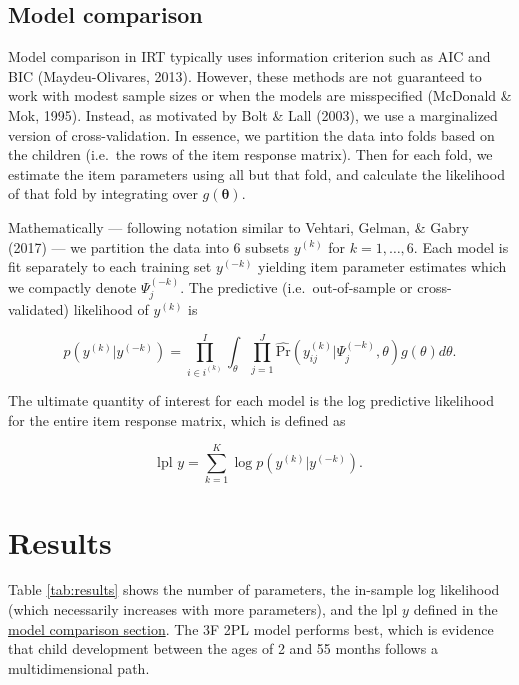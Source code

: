 \documentclass[10pt, letterpaper]{article}
\begin{document}
\hypertarget{modelcompare}{%
\subsection{Model comparison}\label{modelcompare}}

Model comparison in IRT typically uses information criterion such as AIC
and BIC (Maydeu-Olivares, 2013). However, these methods are not
guaranteed to work with modest sample sizes or when the models are
misspecified (McDonald \& Mok, 1995). Instead, as motivated by Bolt \&
Lall (2003), we use a marginalized version of cross-validation. In
essence, we partition the data into folds based on the children
(i.e.~the rows of the item response matrix). Then for each fold, we
estimate the item parameters using all but that fold, and calculate the
likelihood of that fold by integrating over \(g(\boldsymbol{\theta})\).

Mathematically --- following notation similar to Vehtari, Gelman, \&
Gabry (2017) --- we partition the data into 6 subsets \(y^{(k)}\) for
\(k = 1, \dots, 6\). Each model is fit separately to each training set
\(y^{(-k)}\) yielding item parameter estimates which we compactly denote
\(\Psi_j^{(-k)}\). The predictive (i.e.~out-of-sample or
cross-validated) likelihood of \(y^{(k)}\) is

\[
p(y^{(k)} | y^{(-k)}) = \prod_{i \in i^{(k)}}^{I} \int_\theta \prod_{j=1}^{J} \hat{\text{Pr}}(y_{ij}^{(k)} | \Psi_j^{(-k)}, \theta) g(\theta)d\theta.
\]

The ultimate quantity of interest for each model is the log predictive
likelihood for the entire item response matrix, which is defined as

\[
\text{lpl } y = \sum_{k = 1}^{K} \log p(y^{(k)} | y^{(-k)}).
\]

\hypertarget{results}{%
\section{Results}\label{results}}

Table \ref{tab:results} shows the number of parameters, the in-sample
log likelihood (which necessarily increases with more parameters), and
the \(\text{lpl } y\) defined in the
\protect\hyperlink{modelcompare}{model comparison section}. The 3F 2PL
model performs best, which is evidence that child development between
the ages of 2 and 55 months follows a multidimensional path.
\end{document}
